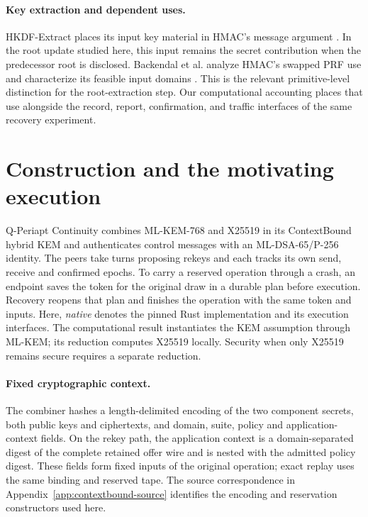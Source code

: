\documentclass[pdflatex]{sn-jnl}
\theoremstyle{thmstyleone}
\theoremstyle{thmstylethree}
\theoremstyle{thmstyletwo}
\newcommand{\qperiapt}{Q-Periapt Continuity}
\begin{document}
\paragraph{Key extraction and dependent uses.}
HKDF-Extract places its input key material in HMAC's message argument
\cite{rfc5869}. In the root update studied here, this input remains the secret
contribution when the predecessor root is disclosed. Backendal et al. analyze
HMAC's swapped PRF use and characterize its feasible input domains
\cite{hmacswap2023}. This is the relevant primitive-level distinction for the
root-extraction step. Our computational accounting places that use alongside
the record, report, confirmation, and traffic interfaces of the same recovery
experiment.
\section{Construction and the motivating execution}
\label{sec:construction}

\qperiapt{} combines ML-KEM-768 and X25519 in its ContextBound hybrid
KEM and authenticates control messages with an ML-DSA-65/P-256
identity. The peers take turns proposing rekeys and each tracks its own
send, receive and confirmed epochs. To carry a reserved operation through
a crash, an endpoint saves the token for the original draw in a durable
plan before execution. Recovery reopens that plan and finishes the
operation with the same token and inputs.
Here, \emph{native} denotes the pinned Rust implementation and its
execution interfaces. The computational result instantiates the KEM
assumption through ML-KEM; its reduction computes X25519 locally.
Security when only X25519 remains secure requires a separate reduction.

\paragraph{Fixed cryptographic context.}
The combiner hashes a length-delimited encoding of the two component secrets,
both public keys and ciphertexts, and domain, suite, policy and
application-context fields. On the rekey path, the application context is a
domain-separated digest of the complete retained offer wire and is nested
with the admitted policy digest. These fields form fixed inputs of the
original operation; exact replay uses the same binding and reserved tape.
The source correspondence in Appendix~\ref{app:contextbound-source} identifies
the encoding and reservation constructors used here.
\end{document}
